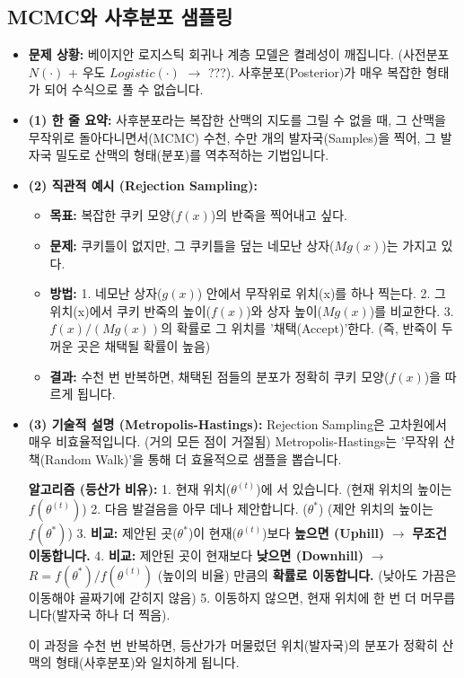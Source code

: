 \documentclass[11pt,a4paper]{book}
\theoremstyle{definition}
\begin{document}
\subsection{MCMC와 사후분포 샘플링}

\begin{itemize}
    \item \textbf{문제 상황:} 베이지안 로지스틱 회귀나 계층 모델은 켤레성이 깨집니다. (사전분포 $N(\cdot)$ + 우도 $Logistic(\cdot)$ $\rightarrow$ ???). 사후분포(Posterior)가 매우 복잡한 형태가 되어 수식으로 풀 수 없습니다.
    \item \textbf{(1) 한 줄 요약:} 사후분포라는 복잡한 산맥의 지도를 그릴 수 없을 때, 그 산맥을 무작위로 돌아다니면서(MCMC) 수천, 수만 개의 발자국(Samples)을 찍어, 그 발자국 밀도로 산맥의 형태(분포)를 역추적하는 기법입니다.
    \item \textbf{(2) 직관적 예시 (Rejection Sampling):}
    \begin{itemize}
        \item \textbf{목표:} 복잡한 쿠키 모양($f(x)$)의 반죽을 찍어내고 싶다.
        \item \textbf{문제:} 쿠키틀이 없지만, 그 쿠키틀을 덮는 네모난 상자($Mg(x)$)는 가지고 있다.
        \item \textbf{방법:}
            1. 네모난 상자($g(x)$) 안에서 무작위로 위치(x)를 하나 찍는다.
            2. 그 위치(x)에서 쿠키 반죽의 높이($f(x)$)와 상자 높이($Mg(x)$)를 비교한다.
            3. $f(x) / (Mg(x))$의 확률로 그 위치를 '채택(Accept)'한다. (즉, 반죽이 두꺼운 곳은 채택될 확률이 높음)
        \item \textbf{결과:} 수천 번 반복하면, 채택된 점들의 분포가 정확히 쿠키 모양($f(x)$)을 따르게 됩니다.
    \end{itemize}
    \item \textbf{(3) 기술적 설명 (Metropolis-Hastings):}
    Rejection Sampling은 고차원에서 매우 비효율적입니다. (거의 모든 점이 거절됨)
    Metropolis-Hastings는 '무작위 산책(Random Walk)'을 통해 더 효율적으로 샘플을 뽑습니다.
    
    \textbf{알고리즘 (등산가 비유):}
    1. 현재 위치($\theta^{(t)}$)에 서 있습니다. (현재 위치의 높이는 $f(\theta^{(t)})$)
    2. 다음 발걸음을 아무 데나 제안합니다. ($\theta^{*}$) (제안 위치의 높이는 $f(\theta^{*})$)
    3. \textbf{비교:} 제안된 곳($\theta^{*}$)이 현재($\theta^{(t)}$)보다 \textbf{높으면 (Uphill)} $\rightarrow$ \textbf{무조건 이동합니다.}
    4. \textbf{비교:} 제안된 곳이 현재보다 \textbf{낮으면 (Downhill)} $\rightarrow$ $R = f(\theta^{*}) / f(\theta^{(t)})$ (높이의 비율) 만큼의 \textbf{확률로 이동합니다.} (낮아도 가끔은 이동해야 골짜기에 갇히지 않음)
    5. 이동하지 않으면, 현재 위치에 한 번 더 머무릅니다(발자국 하나 더 찍음).
    
    이 과정을 수천 번 반복하면, 등산가가 머물렀던 위치(발자국)의 분포가 정확히 산맥의 형태(사후분포)와 일치하게 됩니다.
\end{itemize}
\end{document}
